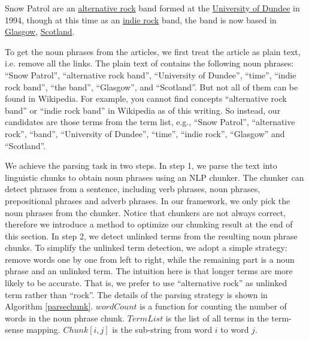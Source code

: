 \begin{example}
\label{ex:snow}
Snow Patrol are an {\uline{alternative rock}} band
formed at the {\uline{University of Dundee}} in 1994,
though at this time as an {\uline{indie rock}} band,
the band is now based in {\uline{Glasgow}},
{\uline{Scotland}}.
\end{example}

To get the noun phrases from the articles,
we first treat the article as plain text, i.e. remove all the links.
The plain text of  contains the following noun phrases:
``Snow Patrol'', ``alternative rock band'', ``University of Dundee'',
``time'', ``indie rock band'', ``the band'', ``Glasgow'', and ``Scotland''.
But not all of them can be found in Wikipedia.
For example, you cannot find concepts ``alternative rock band'' or
``indie rock band'' in Wikipedia as of this writing.
So instead, our candidates are those terms from the term list, e.g.,
``Snow Patrol'', ``alternative rock'', ``band'', ``University of Dundee'',
``time'', ``indie rock'', ``Glasgow'' and ``Scotland''.

We achieve the parsing task in two steps.
In step 1, we parse the text into linguistic chunks to obtain noun phrases
using an NLP chunker. The chunker can detect phrases from
a sentence, including verb phrases, noun phrases, prepositional phrases and
adverb phrases. In our framework, we only pick the noun phrases from the chunker.
Notice that chunkers are not always correct, therefore we introduce
a method to optimize our chunking result at the end of this section.
In step 2, we detect unlinked terms from the resulting noun
phrase chunks. To simplify the unlinked term
detection, we adopt a simple strategy:
remove words one by one from left to right, while the remaining part is
a noun phrase and an unlinked term.
The intuition here is that longer terms are more likely to
be accurate. That is, we prefer to use ``alternative rock'' as
unlinked term rather than ``rock''.
The details of the parsing strategy is shown in Algorithm \ref{parsechunk}.
$wordCount$ is a function for counting the number of words in the
noun phrase chunk.
$TermList$ is the list of all terms in the term-sense mapping.
$Chunk[i,j]$ is the sub-string from word $i$ to word $j$.

